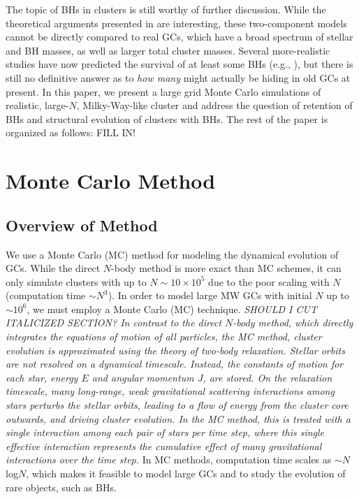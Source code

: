 \documentclass[12pt,preprint]{aastex}
\begin{document}
The topic of BHs in clusters is still worthy of further discussion. While the theoretical arguments presented in \cite{Breen2013} are interesting, these two-component models cannot be directly compared to real GCs, which have a  broad spectrum of stellar and BH masses, as well as larger total cluster masses. Several more-realistic studies have now predicted the survival of at least some BHs (e.g., \citealt{Mackey2008, Morscher2013, Sippel2013}), but there is still no definitive answer as to \emph{how many} might actually be hiding in old GCs at present. 
In this paper, we present a large grid Monte Carlo simulations of realistic, large-$N$, Milky-Way-like cluster and address the question of retention of BHs and structural evolution of clusters with BHs.
The rest of the paper is organized as follows:  FILL IN!




\section{Monte Carlo Method}
\subsection{Overview of Method}
We use a Monte Carlo (MC) method for modeling the dynamical evolution of GCs.
While the direct $N$-body method is more exact than MC schemes, 
it can only simulate clusters with up to $N \sim 10 \times 10^5$ due to the
poor scaling with $N$ (computation time $\sim N^3$). In order to model large MW GCs
with initial $N$ up to $\sim 10^6$, we must employ a Monte Carlo (MC) technique. 
\emph{SHOULD I CUT ITALICIZED SECTION? In contrast to the direct $N$-body method, 
which directly integrates the equations 
of motion of all particles, the MC method, cluster evolution is approximated using the 
theory of two-body relaxation. Stellar orbits are not resolved on a dynamical
timescale. Instead, the constants of motion for each star, energy $E$ and angular 
momentum $J$, are stored. On the relaxation timescale, many long-range,
weak gravitational scattering interactions among stars perturbs the stellar orbits, 
 leading to a flow of energy from the cluster core outwards, and driving 
 cluster evolution. In the MC method, this is treated with a single interaction
  among each pair of stars per time step, where this single effective interaction 
  represents the cumulative effect of many gravitational interactions over
   the time step.} In MC methods, computation time scales as 
   $\sim N$ log$N$, which makes it feasible to model large
 GCs and to study the evolution of rare objects, such as BHs.
\end{document}
